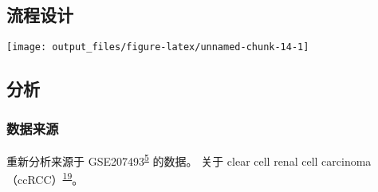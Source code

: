 \documentclass[
]{article}
\begin{document}
\hypertarget{ux6d41ux7a0bux8bbeux8ba1}{%
\subsection{流程设计}\label{ux6d41ux7a0bux8bbeux8ba1}}

\texttt{[image: output\_files/figure-latex/unnamed-chunk-14-1]}

\hypertarget{ux5206ux6790}{%
\subsection{分析}\label{ux5206ux6790}}

\hypertarget{ux6570ux636eux6765ux6e90}{%
\subsubsection{数据来源}\label{ux6570ux636eux6765ux6e90}}

重新分析来源于 GSE207493\textsuperscript{\protect\hyperlink{ref-IntegrativeSinYuZh2023}{5}} 的数据。
关于 clear cell renal cell carcinoma（ccRCC）\textsuperscript{\protect\hyperlink{ref-ClearCellRenaJonasc2020}{19}}。
\end{document}

